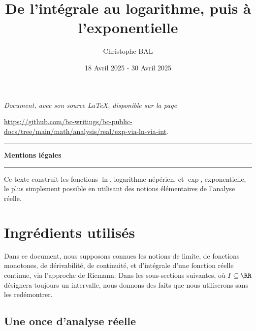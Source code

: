 \documentclass[12pt]{amsart}
\begin{document}
\title{De l'intégrale au logarithme, puis à l'exponentielle}
\author{Christophe BAL}
\date{18 Avril 2025 - 30 Avril 2025}

\maketitle

\begin{center}
	\itshape
	Document, avec son source \LaTeX, disponible sur la page

	\url{https://github.com/bc-writings/bc-public-docs/tree/main/math/analysis/real/exp-via-ln-via-int}.
\end{center}


\bigskip


\begin{center}
	\hrule\vspace{.3em}
	{
		\fontsize{1.35em}{1em}\selectfont
		\textbf{Mentions \og légales \fg}
	}

	\vspace{0.45em}
	\doclicenseThis
	\hrule
\end{center}


\bigskip


\setcounter{tocdepth}{2}
\tableofcontents




\newpage

\begin{meta-abstract*}
	Ce texte construit les fonctions $\ln$, logarithme népérien, et $\exp$, exponentielle, le plus simplement possible en utilisant des notions élémentaires de l'analyse réelle.
\end{meta-abstract*}




\section{Ingrédients utilisés}

Dans ce document,
nous supposons connues les notions
de limite,
de fonctions monotones,
de dérivabilité,
de continuité,
et
d'intégrale d'une fonction réelle continue, via l'approche de Riemann.
%
Dans les sous-sections suivantes, où $I \subseteq \RR$ désignera toujours un intervalle, nous donnons des faits que nous utiliserons sans les redémontrer.


	\subsection{Une once d'analyse réelle}
\end{document}
